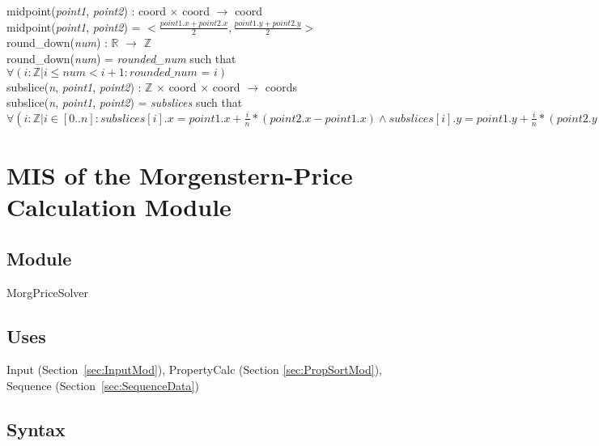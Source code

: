 \documentclass[12pt, titlepage]{article}
\begin{document}
\noindent midpoint(\textit{point1}, \textit{point2}) : coord $\times$ coord 
$\rightarrow$ coord\\
midpoint(\textit{point1}, \textit{point2}) = $< \frac{point1.x + point2.x}{2}, 
\frac{point1.y + point2.y}{2} >$\\

\noindent round\_down(\textit{num}) : $\mathbb{R}$ $\rightarrow$ $\mathbb{Z}$\\
round\_down(\textit{num}) = \textit{rounded\_num} such that\\
$\forall(i : \mathbb{Z} | i \leq \textit{num} < i + 1 : \textit{rounded\_num = 
i})$\\

\noindent subslice(\textit{n}, \textit{point1}, \textit{point2}) : $\mathbb{Z}$ 
$\times$ coord $\times$ coord $\rightarrow$ coords\\
subslice(\textit{n}, \textit{point1}, \textit{point2}) = \textit{subslices} 
such that\\
$\forall(i : \mathbb{Z} | i \in [0..n] : subslices[i].x = point1.x + 
\frac{i}{n}*(point2.x - point1.x) \land subslices[i].y = point1.y + 
\frac{i}{n}*(point2.y - point1.y))$\\

\newpage
\section{MIS of the Morgenstern-Price Calculation Module} \label{sec:MPMod}

\subsection{Module}
MorgPriceSolver

\subsection{Uses}

Input (Section~\ref{sec:InputMod}), PropertyCalc (Section 
\ref{sec:PropSortMod}), Sequence (Section~\ref{sec:SequenceData})

\subsection{Syntax}
\end{document}
